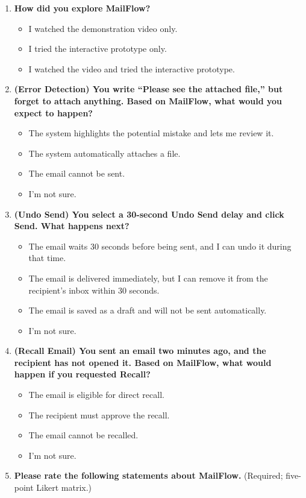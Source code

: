 \documentclass[letterpaper]{jdf}
\begin{document}
\begin{enumerate}
\item \textbf{How did you explore MailFlow?}
\begin{itemize}
\item I watched the demonstration video only.
\item I tried the interactive prototype only.
\item I watched the video and tried the interactive prototype.
\end{itemize}
\item \textbf{(Error Detection) You write ``Please see the attached file,'' but forget to attach anything. Based on MailFlow, what would you expect to happen?}
\begin{itemize}
\item The system highlights the potential mistake and lets me review it.
\item The system automatically attaches a file.
\item The email cannot be sent.
\item I'm not sure.
\end{itemize}
\item \textbf{(Undo Send) You select a 30-second Undo Send delay and click Send. What happens next?}
\begin{itemize}
\item The email waits 30 seconds before being sent, and I can undo it during that time.
\item The email is delivered immediately, but I can remove it from the recipient's inbox within 30 seconds.
\item The email is saved as a draft and will not be sent automatically.
\item I'm not sure.
\end{itemize}
\item \textbf{(Recall Email) You sent an email two minutes ago, and the recipient has not opened it. Based on MailFlow, what would happen if you requested Recall?}
\begin{itemize}
\item The email is eligible for direct recall.
\item The recipient must approve the recall.
\item The email cannot be recalled.
\item I'm not sure.
\end{itemize}
\item \textbf{Please rate the following statements about MailFlow.} (Required; five-point Likert matrix.)

\end{enumerate}
\end{document}

